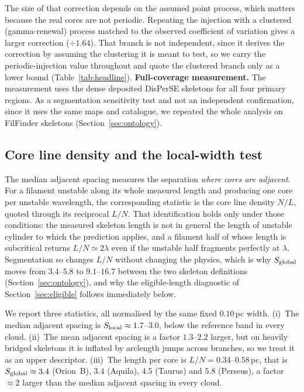 \documentclass[usenatbib,twoside,twocolumn]{mnras}
\begin{document}
The size of that correction depends on the assumed point process, which matters because the real cores are not periodic. Repeating the injection with a clustered (gamma-renewal) process matched to the observed coefficient of variation gives a larger correction ($\div1.64$). That branch is not independent, since it derives the correction by assuming the clustering it is meant to test, so we carry the periodic-injection value throughout and quote the clustered branch only as a lower bound (Table~\ref{tab:headline}). 
\smallskip\noindent\textbf{Full-coverage measurement.} The measurement uses the dense deposited DisPerSE skeletons for all four primary regions. As a segmentation sensitivity test  and not an independent confirmation, since it uses the same maps and catalogue, we repeated the whole analysis on FilFinder skeletons (Section~\ref{sec:ontology}).



\subsection{Core line density and the local-width test}
\label{sec:linedensity}

The median adjacent spacing measures the separation \emph{where cores are adjacent}. For a filament unstable along its whole measured length and producing one core per unstable wavelength, the corresponding statistic is the core line density $N/L$, quoted through its reciprocal $L/N$. That identification holds only under those conditions: the measured skeleton length is not in general the length of unstable cylinder to which the prediction applies, and a filament half of whose length is subcritical returns $L/N\simeq2\lambda$ even if the unstable half fragments perfectly at $\lambda$. Segmentation so changes $L/N$ without changing the physics, which is why $S_{\rm global}$ moves from $3.4$--$5.8$ to $9.1$--$16.7$ between the two skeleton definitions (Section~\ref{sec:ontology}), and why the eligible-length diagnostic of Section~\ref{sec:eligible} follows immediately below.

We report three statistics, all normalised by the same fixed $0.10$\,pc width. (i)~The median adjacent spacing is $S_{\rm local}\approx1.7$--$3.0$, below the reference band in every cloud. (ii)~The mean adjacent spacing is a factor $1.3$--$2.2$ larger, but on heavily bridged skeletons it is inflated by arclength jumps across branches, so we treat it as an upper descriptor. (iii)~The length per core is $L/N=0.34$--$0.58$\,pc, that is $S_{\rm global}\approx3.4$ (Orion~B), $3.4$ (Aquila), $4.5$ (Taurus) and $5.8$ (Perseus), a factor $\approx2$ larger than the median adjacent spacing in every cloud.
\end{document}
